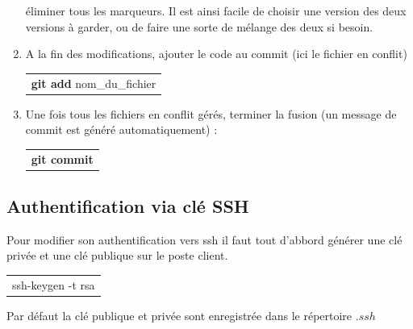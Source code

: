 \documentclass[a4paper,10pt]{article}
\begin{document}
\begin{spacing}{1.5}
\begin{enumerate}
éliminer tous les marqueurs. Il est ainsi facile de choisir une version des deux
versions à garder, ou de faire une sorte de mélange des deux si besoin.
\item A la fin des modifications, ajouter le code au commit (ici le fichier en conflit)
\begin{center}
  \begin{tabular}{c}
    \rowcolor{lightgray!50!white}
      \textbf{git add} nom\_du\_fichier
  \end{tabular}
\end{center}
\item Une fois tous les fichiers en conflit gérés, terminer la fusion (un message de commit est généré automatiquement) :
\begin{center}
  \begin{tabular}{c}
    \rowcolor{lightgray!50!white}
      \textbf{git commit}
  \end{tabular}
\end{center}
\end{enumerate}

\subsection*{Authentification via clé SSH}
Pour modifier son authentification vers ssh il faut tout d'abbord générer une
clé privée et une clé publique sur le poste client.
\begin{center}
  \begin{tabular}{c}
    \rowcolor{lightgray!50!white}
      ssh-keygen -t rsa
  \end{tabular}
\end{center}
Par défaut la clé publique et privée sont enregistrée dans le répertoire $.ssh$

\newpage
\end{spacing}
\end{document}
